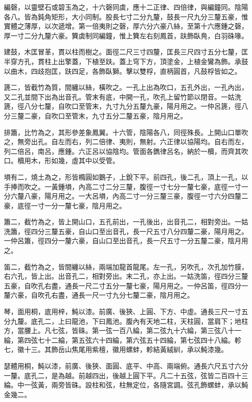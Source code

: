 \begin{pinyinscope}
編磬，以靈壁石或碧玉為之，十六磬同虡，應十二正律、四倍律，與編鐘同。陰陽各八。皆為鈍角矩形，大小同制。股長七寸二分九釐，鼓長一尺九分三釐五豪，惟實體之薄厚，以次遞增。第一倍夷則之磬，厚六分六豪八絲，至第十六應鍾之磬，厚一寸二分九釐六豪。簨虡制同編鐘，惟上簨左右刻鳳首，趺飾臥鳧，白羽硃喙。

建鼓，木匡冒革，貫以柱而樹之。面徑二尺三寸四釐，匡長三尺四寸五分七釐，匡半穿方孔，貫柱上出擎蓋，下植至趺。蓋上穹下方，頂塗金，上植金鸞為飾。承鼓以曲木，四歧抱匡，趺四足，各飾臥獅。擊以雙桴，直柄圓首，凡鼓桴皆如之。

篪二，皆截竹為質，間纏以絲，橫吹之。一孔上出為吹口，五孔外出，一孔內出，又二孔並間下出為出音孔。管末有底，中開一孔，吹孔上留竹節以閉音。一姑洗篪，徑八分七釐，自吹口至管末，九寸九分五釐九豪，陽月用之。一仲呂篪，徑八分三釐二豪，自吹口至管末，九寸五分二釐五豪，陰月用之。

排簫，比竹為之，其形參差象鳳翼。十六管，陰陽各八，同徑殊長。上開山口單吹之，無旁出孔。自左而右，列二倍律、夷則，無射。六正律以協陽均。自右而左，列二倍呂，南呂，應鍾。六正呂以協陰均。管面各鐫律呂名，納於一櫝，而齊其吹口。櫝用木，形如幾，虛其中以受管。

塤有二，燒土為之，形皆橢圓如鵝子，上銳下平。前四孔，後二孔，頂上一孔，以手捧而吹之。一黃鍾塤，內高二寸二分三釐，腹徑一寸七分一釐七豪，底徑一寸一分六釐八豪，陽月用之。一大呂塤，內高二寸一分三釐三豪，腹徑一寸六分四釐二豪，底徑一寸一分一釐七豪，陰月用之。

簫二，截竹為之，皆上開山口，五孔前出，一孔後出，出音孔二，相對旁出。一姑洗簫，徑四分三釐五豪，自山口至出音孔，長一尺五寸八分四釐二豪，陽月用之。一仲呂簫，徑四分一釐六豪，自山口至出音孔，長一尺五寸一分五釐二豪，陰月用之。

笛二，截竹為之，皆間纏以絲，兩端加龍首龍尾。左一孔，另吹孔，次孔加竹膜，右六孔，皆上出。出音孔二，相對旁出。末二孔，亦上出。一姑洗笛，徑四分三釐五豪，自吹孔右盡，通長一尺二寸五分一釐七豪，陽月用之。一仲呂笛，徑四分一釐六豪，自吹孔右盡，通長一尺一寸九分七釐二豪，陰月用之。

琴，面用桐，底用梓，魨以漆。前廣、後狹、上圓、下方、中虛。通長三尺一寸五分九釐。底孔二，上曰龍池，下曰鳳池。腹內有天地二柱，天柱圓，當肩下；地柱方，當腰上。凡七弦，皆硃。第一弦一百八綸，第二弦九十六綸，第三弦八十一綸，第四弦七十二綸，第五弦六十四綸，第六弦五十四綸，第七弦四十八綸。軫七，徽十三。其飾岳山焦尾用紫檀，徽用螺蚌，軫結黃絨紃，承以魨漆幾。

瑟體用桐，魨以漆，前廣、後狹、面圓、底平、中高、兩端俯。通長六尺五寸六分一釐。底孔二，是為越。前越四出，後越上圓下平。凡二十五弦，弦皆二百四十三綸。中一弦黃，兩旁皆硃。設柱和弦，柱無定位，各隨宮調。弦孔飾螺蚌，承以魨金幾二。


\end{pinyinscope}
